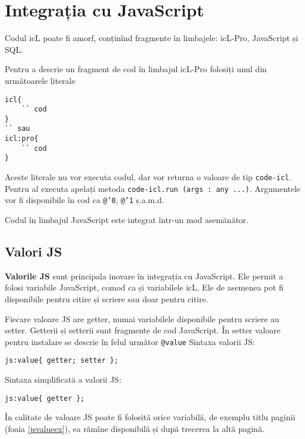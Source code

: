 \section{Integrația cu JavaScript}

Codul icL poate fi amorf, conținînd fragmente în limbajele: icL-Pro, JavaScript și SQL.

Pentru a descrie un fragment de cod în limbajul icL-Pro folosiți unul din următoarele literale 
\begin{verbatim}
icl{
	`` cod
}
`` sau
icl:pro{
	`` cod
}
\end{verbatim}

Aceste literale nu vor executa codul, dar vor returna o valoare de tip \texttt{code-icl}. Pentru al executa apelați metoda \texttt{code-icl.run (args : any ...)}. Argumentele vor fi disponibile în cod ca \texttt{@'0}, \texttt{@'1} ș.a.m.d.

Codul în limbajul JavaScript este integrat într-un mod asemănător.

\subsection{Valori JS}

{\bf Valorile JS} sunt principala inovare în integrația cu JavaScript. Ele permit a folosi variabile JavaScript, comod ca și variabilele icL. Ele de asemenea pot fi disponibile pentru citire și scriere sau doar pentru citire.

Fiecare valoare JS are getter, numai variabilele disponibile pentru scriere au setter. Getterii și setterii sunt fragmente de cod JavaScript. În setter valoare pentru instalare se descrie în felul următor \texttt{@{value}} Sintaxa valorii JS:
\begin{verbatim}
js:value{ getter; setter };
\end{verbatim}

Sintaxa simplificată a valorii JS:
\begin{verbatim}
js:value{ getter };
\end{verbatim}

În calitate de valoare JS poate fi folosită orice variabilă, de exemplu titlu paginii (foaia \ref{jsvalueex}), ea rămîne disponibilă și după trecerea la altă pagină.

\begin{sourcecode}
    \label{jsvalueex}
    \inputminted[linenos]{icl}{../sources/jsvalueex.icL}
\end{sourcecode}


